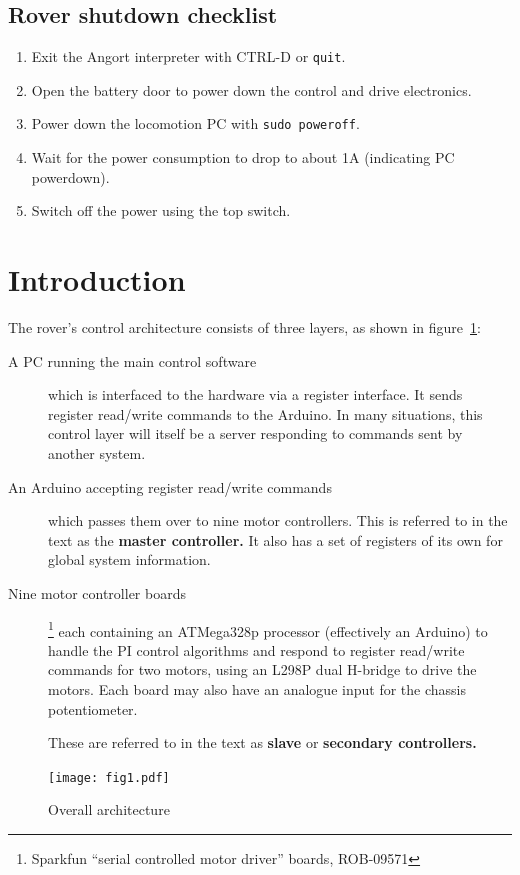 \subsection{Rover shutdown checklist}
\begin{enumerate}
\item Exit the Angort interpreter with CTRL-D or \texttt{quit}.
\item Open the battery door to power down the control and drive
electronics.
\item Power down the locomotion PC with \texttt{sudo poweroff}.
\item Wait for the power consumption to drop to about 1A (indicating
PC powerdown).
\item Switch off the power using the top switch.
\end{enumerate}



\section{Introduction}
The rover's control architecture consists of three layers, as shown
in figure~\ref{fig1}:
\begin{description}
\item[A PC running the main control software] which is interfaced to the
hardware via a register interface. It sends register read/write commands
to the Arduino. In many situations, this control layer will itself
be a server responding to commands sent by another system.
\item[An Arduino accepting register read/write commands] which passes
them over
\isqc{} to nine motor controllers. This is referred to in the text as
the \textbf{master controller.} It also has a set of registers of its own
for global system information.
\item[Nine motor controller boards]\footnote{Sparkfun ``serial controlled
motor driver'' boards, ROB-09571} each containing an ATMega328p processor
(effectively an Arduino) to handle the PI control algorithms and respond
to register read/write commands for two motors, using an
L298P dual H-bridge to drive the motors. Each board may also have an analogue
input for the chassis potentiometer.

These are
referred to in the text as \textbf{slave} or \textbf{secondary controllers.} 
\end{description}

\begin{figure}[ht]
\center
\texttt{[image: fig1.pdf]}
\caption{Overall architecture}
\label{fig1}
\end{figure}

